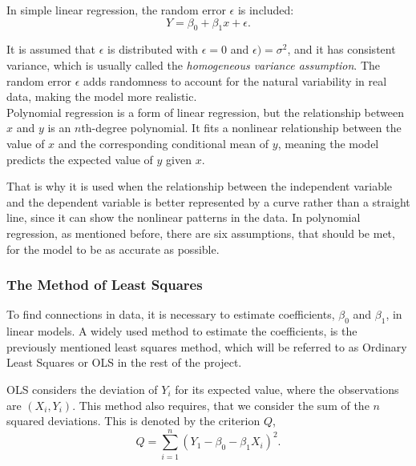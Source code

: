 \noindent In simple linear regression, the random error \( \epsilon \) is included:
\begin{equation}
Y = \beta_0 + \beta_1 x + \epsilon .
\end{equation}


\noindent It is assumed that \( \epsilon \) is distributed with $\epsilon = 0$ and $\epsilon) = \sigma^2$, and it has consistent variance, which is usually called the \textit{homogeneous variance assumption}. The random error \( \epsilon \) adds randomness to account for the natural variability in real data, making the model more realistic.
\newline\\
Polynomial regression is a form of linear regression, but the relationship between \( x \) and \( y \) is an \( n \)th-degree polynomial. It fits a nonlinear relationship between the value of \( x \) and the corresponding conditional mean of \( y \), meaning the model predicts the expected value of \( y \) given \( x \). \newline

\noindent That is why it is used when the relationship between the independent variable and the dependent variable is better represented by a curve rather than a straight line, since it can show the nonlinear patterns in the data.
In polynomial regression, as mentioned before, there are six assumptions, that should be met, for the model to be as accurate as possible.


\subsubsection{The Method of Least Squares}

\noindent To find connections in data, it is necessary to estimate coefficients, $\beta_0$ and $\beta_1$, in linear models. 
A widely used method to estimate the coefficients, is the previously mentioned least squares method, which will be referred to as Ordinary Least Squares or OLS in the rest of the project. \newline

\noindent OLS considers the deviation of $Y_i$ for  its expected value, where the observations are $(X_i, Y_i)$. 
This method also requires, that we consider the sum of the $n$ squared deviations.
This is denoted by the criterion $Q$,
\begin{equation}
Q=\sum_{i=1}^{n}(Y_1-\beta_0 - \beta_1 X_i)^2 .
\end{equation}

